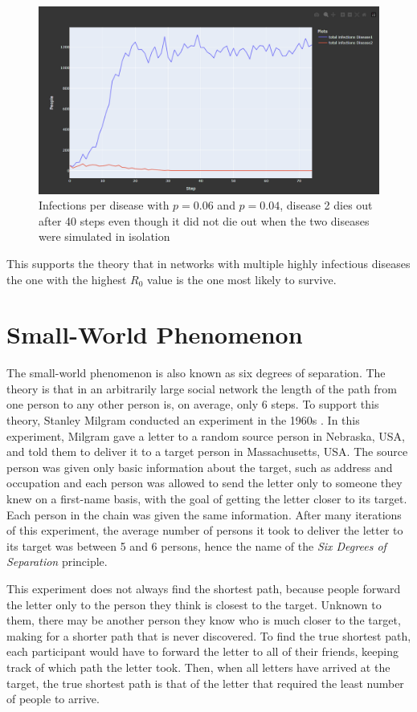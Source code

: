 \begin{figure}
    \centering
    \includegraphics[width=0.5\linewidth]{images/exp_multiple_diseases_both.png}
    \caption{Infections per disease with $p = 0.06$ and $p = 0.04$, disease 2 dies out after 40 steps even though it did not die out when the two diseases were simulated in isolation}
    \label{fig:exp_multiple_diseases}
\end{figure}

This supports the theory that in networks with multiple highly infectious diseases the one with the highest $R_0$ value is the one most likely to survive.

\section{Small-World Phenomenon}
The small-world phenomenon is also known as six degrees of separation. The theory is that in an arbitrarily large social network the length of the path from one person to any other person is, on average, only 6 steps. To support this theory, Stanley Milgram conducted an experiment in the 1960s \cite{smallWorld}. In this experiment, Milgram gave a letter to a random source person in Nebraska, USA, and told them to deliver it to a target person in Massachusetts, USA. The source person was given only basic information about the target, such as address and occupation and each person was allowed to send the letter only to someone they knew on a first-name basis, with the goal of getting the letter closer to its target. Each person in the chain was given the same information. After many iterations of this experiment, the average number of persons it took to deliver the letter to its target was between 5 and 6 persons, hence the name of the \textit{Six Degrees of Separation} principle.

This experiment does not always find the shortest path, because people forward the letter only to the person they think is closest to the target. Unknown to them, there may be another person they know who is much closer to the target, making for a shorter path that is never discovered. To find the true shortest path, each participant would have to forward the letter to all of their friends, keeping track of which path the letter took. Then, when all letters have arrived at the target, the true shortest path is that of the letter that required the least number of people to arrive.

